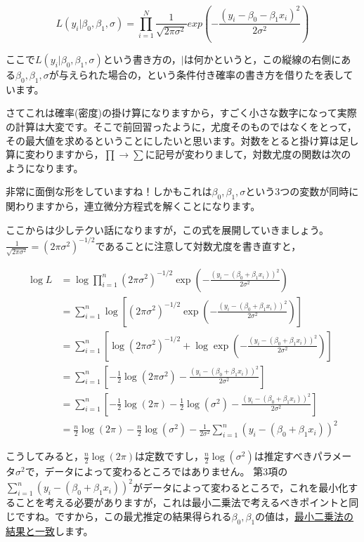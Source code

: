 \documentclass{ltjbook}
\begin{document}
\[ L(y_i | \beta_0,\beta_1,\sigma) = \prod_{i=1}^N \frac{1}{\sqrt{2\pi \sigma^2}}exp\left(- \frac{(y_i-\beta_0 - \beta_1 x_i)^2}{2\sigma^2}\right)\]

ここで$L(y_i | \beta_0,\beta_1,\sigma) $という書き方の，$\mid$は何かというと，この縦線の右側にある$\beta_0,\beta_1,\sigma$が与えられた場合の，という条件付き確率の書き方を借りたを表しています。

さてこれは確率(密度)の掛け算になりますから，すごく小さな数字になって実際の計算は大変です。そこで前回習ったように，尤度そのものではなくをとって，その最大値を求めるということにしたいと思います。対数をとると掛け算は足し算に変わりますから，$\prod \to \sum$に記号が変わりまして，対数尤度の関数は次のようになります。


非常に面倒な形をしていますね！しかもこれは$\beta_0,\beta_1,\sigma$という3つの変数が同時に関わりますから，連立微分方程式を解くことになります。

ここからは少しテクい話になりますが，この式を展開していきましょう。$\frac{1}{\sqrt{2\pi\sigma^2}}=(2\pi\sigma^2)^{-1/2}$であることに注意して対数尤度を書き直すと，

\begin{align*}
\log L &= \log\prod_{i=1}^n (2\pi\sigma^2)^{-1/2}\exp\left(-\frac{(y_i-(\beta_0+\beta_1x_i))^2}{2\sigma^2}\right) \\
&= \sum_{i=1}^n \log\left[(2\pi\sigma^2)^{-1/2}\exp\left(-\frac{(y_i-(\beta_0+\beta_1x_i))^2}{2\sigma^2}\right)\right] \\
&= \sum_{i=1}^n \left[\log(2\pi\sigma^2)^{-1/2} + \log\exp\left(-\frac{(y_i-(\beta_0+\beta_1x_i))^2}{2\sigma^2}\right)\right] \\
&= \sum_{i=1}^n \left[-\frac{1}{2}\log(2\pi\sigma^2) - \frac{(y_i-(\beta_0+\beta_1x_i))^2}{2\sigma^2}\right]\\
&= \sum_{i=1}^n \left[-\frac{1}{2}\log(2\pi) - \frac{1}{2}\log(\sigma^2) - \frac{(y_i-(\beta_0+\beta_1x_i))^2}{2\sigma^2}\right]\\
&= \frac{n}{2} \log(2\pi) - \frac{n}{2} \log(\sigma^2) - \frac{1}{2\sigma^2} \sum_{i=1}^{n} (y_i-(\beta_0+\beta_1x_i))^2
\end{align*}

こうしてみると，$\frac{n}{2} \log(2\pi)$は定数ですし，$\frac{n}{2} \log(\sigma^2) $は推定すべきパラメータ$\sigma^2$で，データによって変わるところではありません。
第3項の$\sum_{i=1}^{n} (y_i-(\beta_0+\beta_1x_i))^2$がデータによって変わるところで，これを最小化することを考える必要がありますが，これは最小二乗法で考えるべきポイントと同じですね。ですから，この最尤推定の結果得られる$\beta_0,\beta_1$の値は，\underline{最小二乗法の結果と一致}します。
\end{document}
